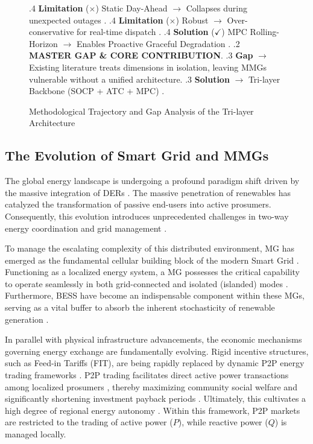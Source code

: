 \begin{figure}[H]
\begin{minipage}{0.95\textwidth}
{.4 \textbf{Limitation} ($\times$) Static Day-Ahead $\to$ Collapses during unexpected outages \cite{Liu2020Robust, Huynh2024Water, zhang2021multi, wu2021model}.
.4 \textbf{Limitation} ($\times$) Robust $\to$ Over-conservative for real-time dispatch \cite{Wang2020DRO, Hussain2021Resilience, Zhang2020Adaptive, Chen2022Robust, Liu2021Distributionally}.
.4 \textbf{Solution} ($\checkmark$) MPC Rolling-Horizon $\to$ Enables Proactive Graceful Degradation \cite{Elkazaz2019Energy, Parisio2014_MPC, zheng2023distributed, zhou2025networked}.
.2 \textbf{MASTER GAP \& CORE CONTRIBUTION}.
.3 \textbf{Gap} $\to$ Existing literature treats dimensions in isolation, leaving MMGs vulnerable without a unified architecture.
.3 \textbf{Solution} $\to$ Tri-layer Backbone (SOCP + ATC + MPC) \cite{Chowdhury2023_SOCP_ThreePhase, Chowdhury2025_SOCP_Coopt, Nakiganda2023_Microgrid, ATC_Coopt_2025, Mavromatis2021_AdaptiveRho, Ullah2022_LMP, Hermans2024_MPC, Hamilton2023_VOLL}.
}
\end{minipage}
\caption{Methodological Trajectory and Gap Analysis of the Tri-layer Architecture}
\label{fig:literature_review_tree}
\end{figure}

\subsection{The Evolution of Smart Grid and MMGs}
The global energy landscape is undergoing a profound paradigm shift driven by the massive integration of DERs \cite{Muhtadi2021, Dagar2021}. The massive penetration of renewables has catalyzed the transformation of passive end-users into active prosumers. Consequently, this evolution introduces unprecedented challenges in two-way energy coordination and grid management \cite{Ahmad2023}.

To manage the escalating complexity of this distributed environment, MG has emerged as the fundamental cellular building block of the modern Smart Grid \cite{She2022}. Functioning as a localized energy system, a MG possesses the critical capability to operate seamlessly in both grid-connected and isolated (islanded) modes \cite{Trivedi2022}. Furthermore, BESS have become an indispensable component within these MGs, serving as a vital buffer to absorb the inherent stochasticity of renewable generation \cite{Choudhury2022}.

In parallel with physical infrastructure advancements, the economic mechanisms governing energy exchange are fundamentally evolving. Rigid incentive structures, such as Feed-in Tariffs (FIT), are being rapidly replaced by dynamic P2P energy trading frameworks \cite{Zhang2018_P2P, Karami2021}. P2P trading facilitates direct active power transactions among localized prosumers \cite{Ali2022}, thereby maximizing community social welfare and significantly shortening investment payback periods \cite{Park2024, Tushar2020_P2P}. Ultimately, this cultivates a high degree of regional energy autonomy \cite{Zia2020}. Within this framework, P2P markets are restricted to the trading of active power ($P$), while reactive power ($Q$) is managed locally.

